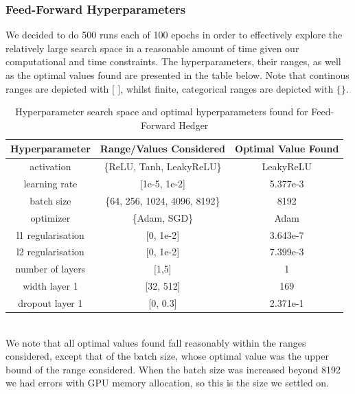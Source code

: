 \documentclass{article}
\theoremstyle{definition}
\begin{document}
\subsubsection{Feed-Forward Hyperparameters}
We decided to do 500 runs each of 100 epochs in order to effectively explore the relatively large search space in a reasonable amount of time given our computational and time constraints. The hyperparameters, their ranges, as well as the optimal values found are presented in the table below. Note that continous ranges are depicted with [ ], whilst finite, categorical ranges are depicted with $\{\}$.
\label{Feedforward hyperparameters}
\begin{table}[h]
\centering
\begin{tabular}{|c|c|c|}
\hline
\textbf{Hyperparameter} & \textbf{Range/Values Considered} &\textbf{Optimal Value Found} \\
\hline
activation & \{ReLU, Tanh, LeakyReLU\}&LeakyReLU\\
learning rate & [1e-5, 1e-2]& 5.377e-3\\
batch size & \{64, 256, 1024, 4096, 8192\}&8192\\
optimizer & \{Adam, SGD\} & Adam\\
l1 regularisation &[0, 1e-2]&3.643e-7\\
l2 regularisation &[0, 1e-2]& 7.399e-3\\
number of layers & [1,5] & 1\\
width layer 1 & [32, 512] &169\\
dropout layer 1 &[0, 0.3]&2.371e-1\\
\hline
\end{tabular}
\caption{Hyperparameter search space and optimal hyperparameters found for Feed-Forward Hedger}
\label{tab:hyperparams}
\end{table}\\
We note that all optimal values found fall reasonably within the ranges considered, except that of the batch size, whose optimal value was the upper bound of the range considered. When the batch size was increased beyond 8192 we had errors with GPU memory allocation, so this is the size we settled on.
\end{document}
